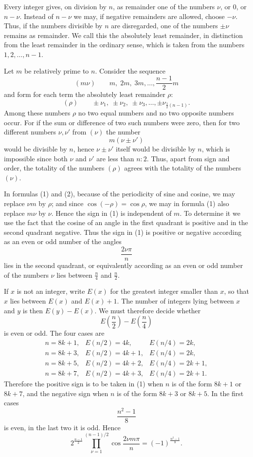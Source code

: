 \documentclass[11pt]{article}
\begin{document}
Every integer gives, on division by $n$, as remainder one of the numbers $\nu$, or $0$, or $n-\nu$. Instead of $n-\nu$ we may, if negative remainders are allowed, choose $-\nu$. Thus, if the numbers divisible by $n$ are disregarded, one of the numbers $\pm\nu$ remains as remainder. We call this the absolutely least remainder, in distinction from the least remainder in the ordinary sense, which is taken from the numbers $1,2,\ldots,n-1$.

Let $m$ be relatively prime to $n$. Consider the sequence
\[
(m\nu)\qquad m,\;2m,\;3m,\ldots,\frac{n-1}{2}m
\]
and form for each term the absolutely least remainder $\rho$:
\[
(\rho)\qquad \pm\nu_1,\;\pm\nu_2,\;\pm\nu_3,\ldots,
       \pm\nu_{\frac12(n-1)}.
\]
Among these numbers $\rho$ no two equal numbers and no two opposite numbers occur. For if the sum or difference of two such numbers were zero, then for two different numbers $\nu,\nu'$ from $(\nu)$ the number
\[
        m(\nu\pm\nu')
\]
would be divisible by $n$, hence $\nu\pm\nu'$ itself would be divisible by $n$, which is impossible since both $\nu$ and $\nu'$ are less than $n:2$. Thus, apart from sign and order, the totality of the numbers $(\rho)$ agrees with the totality of the numbers $(\nu)$.

In formulas (1) and (2), because of the periodicity of sine and cosine, we may replace $\nu m$ by $\rho$; and since $\cos(-\rho)=\cos\rho$, we may in formula (1) also replace $m\nu$ by $\nu$. Hence the sign in (1) is independent of $m$. To determine it we use the fact that the cosine of an angle in the first quadrant is positive and in the second quadrant negative. Thus the sign in (1) is positive or negative according as an even or odd number of the angles
\[
        \frac{2\nu\pi}{n}
\]
lies in the second quadrant, or equivalently according as an even or odd number of the numbers $\nu$ lies between $\frac n4$ and $\frac n2$.

If $x$ is not an integer, write $E(x)$ for the greatest integer smaller than $x$, so that $x$ lies between $E(x)$ and $E(x)+1$. The number of integers lying between $x$ and $y$ is then $E(y)-E(x)$. We must therefore decide whether
\[
        E\left(\frac n2\right)-E\left(\frac n4\right)
\]
is even or odd. The four cases are
\[
\begin{array}{lll}
 n=8k+1, & E(n/2)=4k,   & E(n/4)=2k,\\
 n=8k+3, & E(n/2)=4k+1, & E(n/4)=2k,\\
 n=8k+5, & E(n/2)=4k+2, & E(n/4)=2k+1,\\
 n=8k+7, & E(n/2)=4k+3, & E(n/4)=2k+1.
\end{array}
\]
Therefore the positive sign is to be taken in (1) when $n$ is of the form $8k+1$ or $8k+7$, and the negative sign when $n$ is of the form $8k+3$ or $8k+5$. In the first cases
\[
        \frac{n^2-1}{8}
\]
is even, in the last two it is odd. Hence
\[
\tag{3}
2^{\frac{n-1}{2}}\prod_{\nu=1}^{(n-1)/2}
       \cos\frac{2\nu m\pi}{n}
   =(-1)^{\frac{n^2-1}{8}}.
\]
\end{document}
